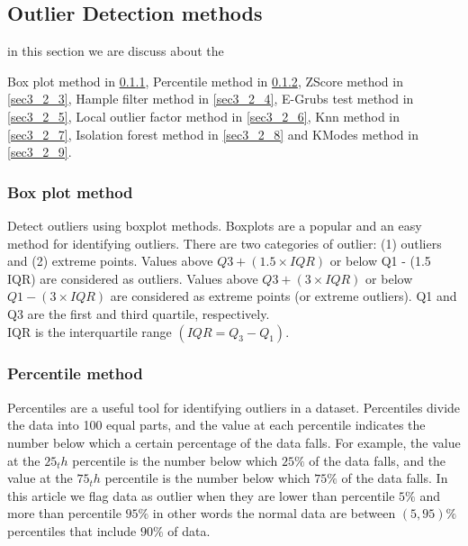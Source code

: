 \documentclass[preprint,12pt]{elsarticle}
\begin{document}
\subsection{Outlier Detection methods}
\label{sec3_2}

in this section we are discuss about the 

Box plot method in \ref{sec3_2_1},
Percentile method in \ref{sec3_2_2},
ZScore method in \ref{sec3_2_3},
Hample filter method in \ref{sec3_2_4},
E-Grubs test method in \ref{sec3_2_5},
Local outlier factor method in \ref{sec3_2_6},
Knn method in \ref{sec3_2_7},
Isolation forest method in \ref{sec3_2_8} and
KModes method in \ref{sec3_2_9}.


\subsubsection{Box plot method}
\label{sec3_2_1}
Detect outliers using boxplot methods. Boxplots are a popular and an easy method for identifying outliers.
There are two categories of outlier: (1) outliers and (2) extreme points.
Values above  $Q3 + (1.5 \times IQR)$ or below Q1 - (1.5 \times IQR) are considered as outliers. Values above 
$Q3 + (3 \times IQR)$ or below  $Q1 - (3 \times IQR)$ are considered as extreme points (or extreme outliers).
Q1 and Q3 are the first and third quartile, respectively.\\
IQR is the interquartile range $(IQR = Q_3 - Q_1)$.

\subsubsection{Percentile method}
\label{sec3_2_2}
Percentiles are a useful tool for identifying outliers in a dataset. Percentiles divide the data into 100 equal parts, and the value at each percentile indicates the number below which a certain percentage of the data falls. For example, the value at the $25_th$ percentile is the number below which $25\%$ of the data falls, and the value at the $75_th$ percentile is the number below which $75\%$ of the data falls. In this article we flag data as
outlier when they are lower than percentile $5\%$ and more than percentile $95\%$ in other words the normal data are between $(5 , 95) \%$ percentiles that include $90\%$ of data.
\end{document}
